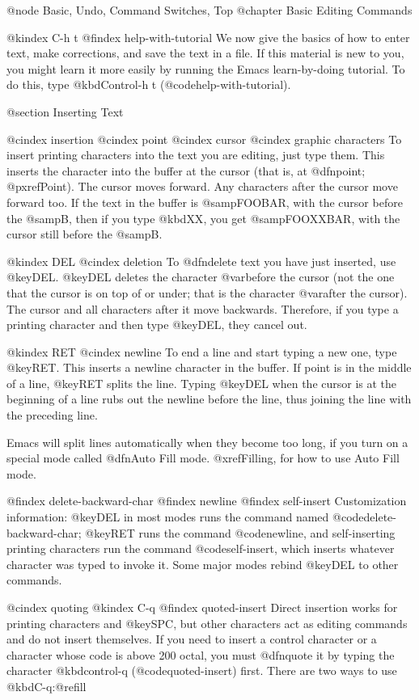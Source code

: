 {{{@node Basic, Undo, Command Switches, Top
@chapter Basic Editing Commands

@kindex C-h t
@findex help-with-tutorial
  We now give the basics of how to enter text, make corrections, and
save the text in a file.  If this material is new to you, you might
learn it more easily by running the Emacs learn-by-doing tutorial.  To
do this, type @kbd{Control-h t} (@code{help-with-tutorial}).

@section Inserting Text

@cindex insertion
@cindex point
@cindex cursor
@cindex graphic characters
  To insert printing characters into the text you are editing, just type
them.  This inserts the character into the buffer at the cursor (that is,
at @dfn{point}; @pxref{Point}).  The cursor moves forward.  Any characters
after the cursor move forward too.  If the text in the buffer is
@samp{FOOBAR}, with the cursor before the @samp{B}, then if you type
@kbd{XX}, you get @samp{FOOXXBAR}, with the cursor still before the
@samp{B}.

@kindex DEL
@cindex deletion
   To @dfn{delete} text you have just inserted, use @key{DEL}.  @key{DEL}
deletes the character @var{before} the cursor (not the one that the cursor
is on top of or under; that is the character @var{after} the cursor).  The
cursor and all characters after it move backwards.  Therefore, if you type
a printing character and then type @key{DEL}, they cancel out.

@kindex RET
@cindex newline
   To end a line and start typing a new one, type @key{RET}.  This inserts
a newline character in the buffer.  If point is in the middle of a line,
@key{RET} splits the line.  Typing @key{DEL} when the cursor is at the
beginning of a line rubs out the newline before the line, thus joining the
line with the preceding line.

  Emacs will split lines automatically when they become too long, if you
turn on a special mode called @dfn{Auto Fill} mode.  @xref{Filling}, for
how to use Auto Fill mode.

@findex delete-backward-char
@findex newline
@findex self-insert
  Customization information: @key{DEL} in most modes runs the command named
@code{delete-backward-char}; @key{RET} runs the command @code{newline}, and
self-inserting printing characters run the command @code{self-insert},
which inserts whatever character was typed to invoke it.  Some major modes
rebind @key{DEL} to other commands.

@cindex quoting
@kindex C-q
@findex quoted-insert
  Direct insertion works for printing characters and @key{SPC}, but other
characters act as editing commands and do not insert themselves.  If you
need to insert a control character or a character whose code is above 200
octal, you must @dfn{quote} it by typing the character @kbd{control-q}
(@code{quoted-insert}) first.  There are two ways to use @kbd{C-q}:@refill

}}}
